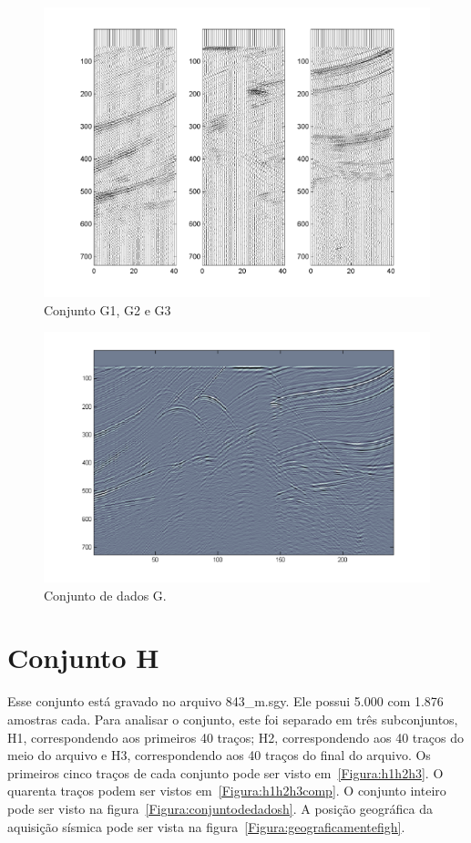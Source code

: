 \begin{figure}[!h]
\centering
\includegraphics[scale=1.01]{fig/fig_G2.png}
\caption{Conjunto G1, G2 e G3}
\label{Figura:g1g2g3comp}
\end{figure}

\begin{figure}[!h]
\centering
\includegraphics[scale=1]{fig/over_img_g.png}
\caption{Conjunto de dados G.}
\label{Figura:conjuntodedadosg}
\end{figure}

\section{Conjunto H}

Esse conjunto está gravado no arquivo 843\_m.sgy. Ele possui 5.000 com 1.876
amostras cada.  Para analisar o conjunto, este foi separado em
três subconjuntos, H1, correspondendo aos primeiros 40 traços; H2,
correspondendo aos 40 traços do meio do arquivo e H3, correspondendo aos 40
traços do final do arquivo. Os primeiros cinco traços de cada conjunto pode ser
visto em~\ref{Figura:h1h2h3}. O quarenta traços podem ser vistos
em~\ref{Figura:h1h2h3comp}. O conjunto inteiro pode ser visto na
figura~\ref{Figura:conjuntodedadosh}. A posição geográfica da aquisição sísmica
pode ser vista na figura~\ref{Figura:geograficamentefigh}.

